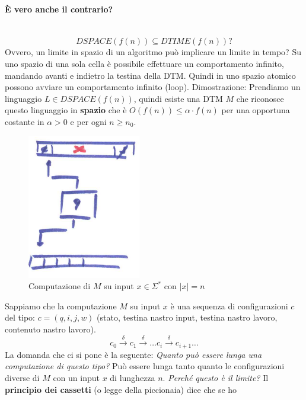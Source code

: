 \documentclass{article}
\begin{document}
\paragraph{È vero anche il contrario?}\mbox{}\\
$$DSPACE(f(n))\subseteq DTIME(f(n))?$$
Ovvero, un limite in spazio di un algoritmo può implicare un limite in tempo? Su uno spazio
di una sola cella è possibile effettuare un comportamento infinito, mandando avanti e indietro
la testina della DTM. Quindi in uno spazio atomico possono avviare un comportamento infinito (loop).
\newline\newline
Dimostrazione: Prendiamo un linguaggio $L\in DSPACE(f(n))$, quindi esiste una DTM $M$ che riconosce
questo linguaggio in \textbf{spazio} che è $O(f(n))\leq\alpha\cdot f(n)$ per una opportuna costante in
$\alpha >0$ e per ogni $n\geq n_0$.
\begin{figure}[H]
    \centering
    \includegraphics[scale=0.6]{images/comput_DTM_c.png}
    \caption{Computazione di $M$ su input $x\in\Sigma^*$ con $|x|=n$}
\end{figure}
Sappiamo che la computazione $M$ su input $x$ è una sequenza di configurazioni $c$ del tipo: $c=(q,i,j,w)$ (stato,
testina nastro input, testina nastro lavoro, contenuto nastro lavoro).
$$c_0\overset{\delta}{\rightarrow}c_1\overset{\delta}{\rightarrow}\dots c_i\overset{\delta}{\rightarrow}c_{i+1}\dots$$
\newline\newline
La domanda che
ci si pone è la seguente: \textit{Quanto può essere lunga una computazione di questo tipo?}
Può essere lunga tanto quanto le configurazioni diverse di $M$ con un input $x$ di lunghezza $n$.
\textit{Perché questo è il limite?}
\newline\newline Il \textbf{principio dei cassetti} (o legge della piccionaia) dice che se ho
\end{document}

